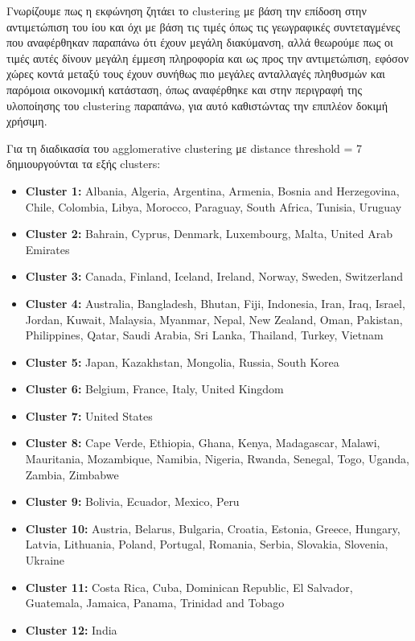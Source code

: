 \documentclass[12pt,a4paper]{article}
\begin{document}
Γνωρίζουμε πως η εκφώνηση ζητάει το clustering με βάση την επίδοση στην αντιμετώπιση του ίου και όχι με βάση τις τιμές όπως τις γεωγραφικές συντεταγμένες που αναφέρθηκαν παραπάνω ότι έχουν μεγάλη διακύμανση, αλλά θεωρούμε πως οι τιμές αυτές δίνουν μεγάλη έμμεση πληροφορία και ως προς την αντιμετώπιση, εφόσον χώρες κοντά μεταξύ τους έχουν συνήθως πιο μεγάλες ανταλλαγές πληθυσμών και παρόμοια οικονομική κατάσταση, όπως αναφέρθηκε και στην περιγραφή της υλοποίησης του clustering παραπάνω, για αυτό καθιστώντας την επιπλέον δοκιμή χρήσιμη.

Για τη διαδικασία του agglomerative clustering με distance threshold = 7 δημιουργούνται τα εξής clusters:

\begin{itemize}
    \item \textbf{Cluster 1:} Albania, Algeria, Argentina, Armenia, Bosnia and Herzegovina, Chile, Colombia, Libya, Morocco, Paraguay, South Africa, Tunisia, Uruguay
    \item \textbf{Cluster 2:} Bahrain, Cyprus, Denmark, Luxembourg, Malta, United Arab Emirates
    \item \textbf{Cluster 3:} Canada, Finland, Iceland, Ireland, Norway, Sweden, Switzerland
    \item \textbf{Cluster 4:} Australia, Bangladesh, Bhutan, Fiji, Indonesia, Iran, Iraq, Israel, Jordan, Kuwait, Malaysia, Myanmar, Nepal, New Zealand, Oman, Pakistan, Philippines, Qatar, Saudi Arabia, Sri Lanka, Thailand, Turkey, Vietnam
    \item \textbf{Cluster 5:} Japan, Kazakhstan, Mongolia, Russia, South Korea
    \item \textbf{Cluster 6:} Belgium, France, Italy, United Kingdom
    \item \textbf{Cluster 7:} United States
    \item \textbf{Cluster 8:} Cape Verde, Ethiopia, Ghana, Kenya, Madagascar, Malawi, Mauritania, Mozambique, Namibia, Nigeria, Rwanda, Senegal, Togo, Uganda, Zambia, Zimbabwe
    \item \textbf{Cluster 9:} Bolivia, Ecuador, Mexico, Peru
    \item \textbf{Cluster 10:} Austria, Belarus, Bulgaria, Croatia, Estonia, Greece, Hungary, Latvia, Lithuania, Poland, Portugal, Romania, Serbia, Slovakia, Slovenia, Ukraine
    \item \textbf{Cluster 11:} Costa Rica, Cuba, Dominican Republic, El Salvador, Guatemala, Jamaica, Panama, Trinidad and Tobago
    \item \textbf{Cluster 12:} India
\end{itemize}
\end{document}
